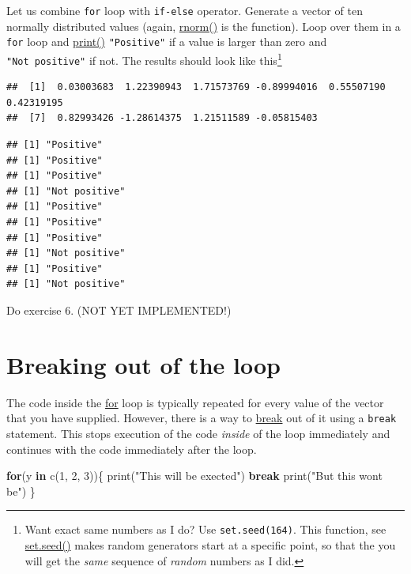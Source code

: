 \documentclass[
]{book}
\newenvironment{Shaded}{\begin{snugshade}}{\end{snugshade}}
\newcommand{\ControlFlowTok}[1]{\textcolor[rgb]{0.13,0.29,0.53}{\textbf{#1}}}
\newcommand{\DecValTok}[1]{\textcolor[rgb]{0.00,0.00,0.81}{#1}}
\newcommand{\FunctionTok}[1]{\textcolor[rgb]{0.00,0.00,0.00}{#1}}
\newcommand{\NormalTok}[1]{#1}
\newcommand{\StringTok}[1]{\textcolor[rgb]{0.31,0.60,0.02}{#1}}
\begin{document}
Let us combine \texttt{for} loop with \texttt{if-else} operator. Generate a vector of ten normally distributed values (again, \href{https://stat.ethz.ch/R-manual/R-devel/library/stats/html/Normal.html}{rnorm()} is the function). Loop over them in a \texttt{for} loop and \href{https://stat.ethz.ch/R-manual/R-devel/library/base/html/print.html}{print()} \texttt{"Positive"} if a value is larger than zero and \texttt{"Not\ positive"} if not. The results should look like this\footnote{Want exact same numbers as I do? Use \texttt{set.seed(164)}. This function, see \href{https://stat.ethz.ch/R-manual/R-devel/library/base/html/Random.html}{set.seed()} makes random generators start at a specific point, so that the you will get the \emph{same} sequence of \emph{random} numbers as I did.}

\begin{verbatim}
##  [1]  0.03003683  1.22390943  1.71573769 -0.89994016  0.55507190  0.42319195
##  [7]  0.82993426 -1.28614375  1.21511589 -0.05815403
\end{verbatim}

\begin{verbatim}
## [1] "Positive"
## [1] "Positive"
## [1] "Positive"
## [1] "Not positive"
## [1] "Positive"
## [1] "Positive"
## [1] "Positive"
## [1] "Not positive"
## [1] "Positive"
## [1] "Not positive"
\end{verbatim}

Do exercise 6. (NOT YET IMPLEMENTED!)

\hypertarget{breaking-out-of-the-loop}{%
\section{Breaking out of the loop}\label{breaking-out-of-the-loop}}

The code inside the \href{https://stat.ethz.ch/R-manual/R-devel/library/base/html/Control.html}{for} loop is typically repeated for every value of the vector that you have supplied. However, there is a way to \href{https://stat.ethz.ch/R-manual/R-devel/library/base/html/Control.html}{break} out of it using a \texttt{break} statement. This stops execution of the code \emph{inside} of the loop immediately and continues with the code immediately after the loop.

\begin{Shaded}
\begin{Highlighting}[]
\ControlFlowTok{for}\NormalTok{(y }\ControlFlowTok{in} \FunctionTok{c}\NormalTok{(}\DecValTok{1}\NormalTok{, }\DecValTok{2}\NormalTok{, }\DecValTok{3}\NormalTok{))\{}
  \FunctionTok{print}\NormalTok{(}\StringTok{"This will be exected"}\NormalTok{)}
  \ControlFlowTok{break}
  \FunctionTok{print}\NormalTok{(}\StringTok{"But this won\textquotesingle{}t be"}\NormalTok{)}
\NormalTok{\}}
\end{Highlighting}
\end{Shaded}
\end{document}
